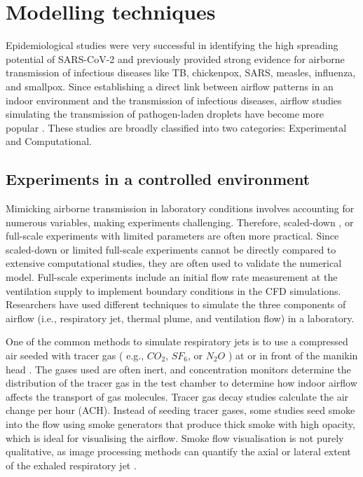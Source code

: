 \documentclass[preprint,12pt]{elsarticle}
\begin{document}
\section{Modelling techniques}

Epidemiological studies were very successful in identifying the high spreading potential of SARS-CoV-2 \cite{rothan2020epidemiology} and previously provided strong evidence for airborne transmission of infectious diseases like TB, chickenpox, SARS, measles, influenza, and smallpox. Since establishing a direct link between airflow patterns in an indoor environment and the transmission of infectious diseases, airflow studies simulating the transmission of pathogen-laden droplets have become more popular \cite{li2007role}. These studies are broadly classified into two categories: Experimental and Computational. 

\subsection{Experiments in a controlled environment}

Mimicking airborne transmission in laboratory conditions involves accounting for numerous variables, making experiments challenging. Therefore, scaled-down \cite{poussou2010flow}, or full-scale experiments with limited parameters \cite{luo2022role} are often more practical. Since scaled-down or limited full-scale experiments cannot be directly compared to extensive computational studies, they are often used to validate the numerical model. Full-scale experiments include an initial flow rate measurement at the ventilation supply to implement boundary conditions in the CFD simulations. Researchers have used different techniques to simulate the three components of airflow (i.e., respiratory jet, thermal plume, and ventilation flow) in a laboratory.

One of the common methods to simulate respiratory jets is to use a compressed air seeded with tracer gas ( e.g., $CO_2$, $SF_6$, or $N_2O$ ) at or in front of the manikin head \cite{qian2008dispersion,ren2022practical,lu2022ventilation}. The gases used are often inert, and concentration monitors determine the distribution of the tracer gas in the test chamber to determine how indoor airflow affects the transport of gas molecules. Tracer gas decay studies calculate the air change per hour (ACH). Instead of seeding tracer gases, some studies seed smoke into the flow using smoke generators that produce thick smoke with high opacity, which is ideal for visualising the airflow. Smoke flow visualisation is not purely qualitative, as image processing methods can quantify the axial or lateral extent of the exhaled respiratory jet \cite{saarinen2015large,pan2022boundary}.
\end{document}
